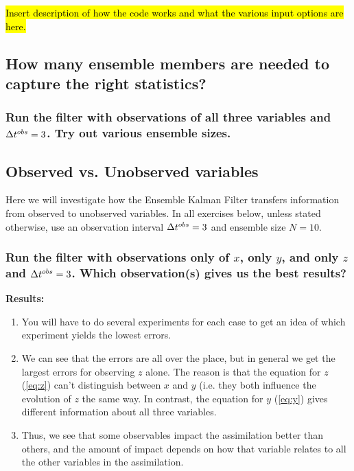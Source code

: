 \hl{Insert description of how the code works and what the various input options are here.}


\subsection{How many ensemble members are needed to capture the right statistics?}
\subsubsection{Run the filter with observations of all three variables and $\Delta t^{obs} = 3$. Try out various ensemble sizes.}

\subsection{Observed vs. Unobserved variables}

Here we will investigate how the Ensemble Kalman Filter transfers information from observed to unobserved variables.
In all exercises below, unless stated otherwise, use an observation interval $\Delta t^{obs}=3$ and ensemble size $N = 10$. 

\subsubsection{Run the filter with observations only of $x$, only $y$, and only $z$ and $\Delta t^{obs} = 3$. Which observation(s) gives us the best results?} 

\textbf{Results:}
\begin{enumerate}
\item You will have to do several experiments for each case to get an idea of which experiment yields the lowest errors. 
\item We can see that the errors are all over the place, but in general we get the largest errors for observing $z$ alone. The reason is that the equation for $z$ (\ref{eq:z}) can't distinguish between $x$ and $y$ (i.e. they both influence the evolution of $z$ the same way.  In contrast, the equation for $y$ (\ref{eq:y}) gives different information about all three variables. 
\item Thus, we see that some observables impact the assimilation better than others, and the amount of impact depends on how that variable relates to all the other variables in the assimilation.
\end{enumerate}

